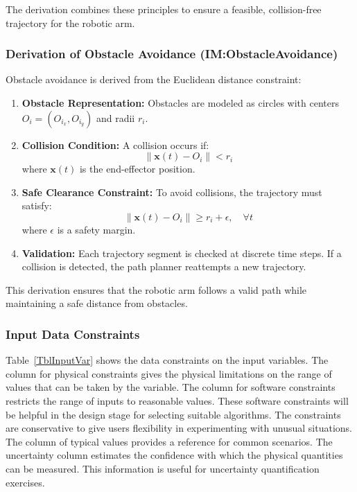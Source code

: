\documentclass[12pt]{article}
\begin{document}
The derivation combines these principles to ensure a feasible, collision-free trajectory for the robotic arm.

\subsubsection*{Derivation of Obstacle Avoidance (IM:ObstacleAvoidance)}

Obstacle avoidance is derived from the Euclidean distance constraint:

\begin{enumerate}
    \item \textbf{Obstacle Representation:} Obstacles are modeled as circles with centers $O_i = (O_{i_x}, O_{i_y})$ and radii $r_i$.

    \item \textbf{Collision Condition:} A collision occurs if:
    \[
    \left\| \mathbf{x}(t) - O_i \right\| < r_i
    \]
    where $\mathbf{x}(t)$ is the end-effector position.

    \item \textbf{Safe Clearance Constraint:} To avoid collisions, the trajectory must satisfy:
    \[
    \left\| \mathbf{x}(t) - O_i \right\| \geq r_i + \epsilon, \quad \forall t
    \]
    where $\epsilon$ is a safety margin.

    \item \textbf{Validation:} Each trajectory segment is checked at discrete time steps. If a collision is detected, the path planner reattempts a new trajectory.
\end{enumerate}

This derivation ensures that the robotic arm follows a valid path while maintaining a safe distance from obstacles.


\subsubsection{Input Data Constraints} \label{sec_DataConstraints}    

Table~\ref{TblInputVar} shows the data constraints on the input variables. The column for physical constraints gives the physical limitations on the range of values that can be taken by the variable. The column for software constraints restricts the range of inputs to reasonable values. These software constraints will be helpful in the design stage for selecting suitable algorithms. The constraints are conservative to give users flexibility in experimenting with unusual situations. The column of typical values provides a reference for common scenarios. The uncertainty column estimates the confidence with which the physical quantities can be measured. This information is useful for uncertainty quantification exercises.
\end{document}
